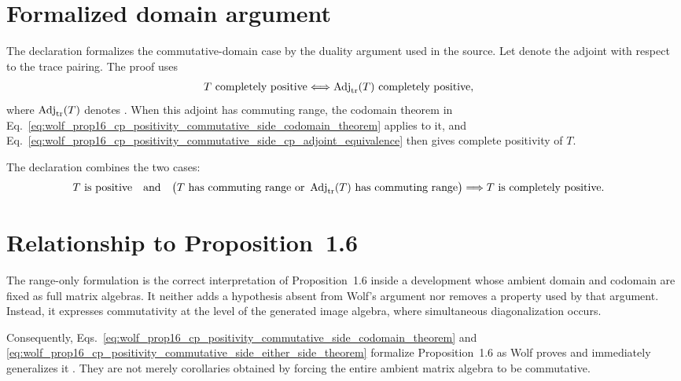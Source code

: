 \documentclass{article}
\begin{document}
\section{Formalized domain argument}

The declaration
formalizes the commutative-domain case by the duality argument used in the
source. Let  denote the adjoint with respect
to the trace pairing. The proof uses
\begin{align}
    T\text{ completely positive}
        &\Longleftrightarrow
        \operatorname{Adj}_{\operatorname{tr}}(T)\text{ completely positive},
    \label{eq:wolf_prop16_cp_positivity_commutative_side_cp_adjoint_equivalence}
\end{align}
where $\operatorname{Adj}_{\operatorname{tr}}(T)$ denotes
. When this adjoint has commuting range, the
codomain theorem in
Eq.~\ref{eq:wolf_prop16_cp_positivity_commutative_side_codomain_theorem}
applies to it, and
Eq.~\ref{eq:wolf_prop16_cp_positivity_commutative_side_cp_adjoint_equivalence}
then gives complete positivity of $T$.

The declaration
combines the two cases:
\begin{align}
    T\text{ is positive}
    \quad\text{and}\quad
    \bigl(  T\text{ has commuting range}
      \ \text{or}\
      \operatorname{Adj}_{\operatorname{tr}}(T)\text{ has commuting range}
    \bigr)
        &\Longrightarrow T\text{ is completely positive}.
    \label{eq:wolf_prop16_cp_positivity_commutative_side_either_side_theorem}
\end{align}

\section{Relationship to Proposition~1.6}

The range-only formulation is the correct interpretation of Proposition~1.6
inside a development whose ambient domain and codomain are fixed as full
matrix algebras. It neither adds a hypothesis absent from Wolf's argument nor
removes a property used by that argument. Instead, it expresses commutativity
at the level of the generated image algebra, where simultaneous
diagonalization occurs.

Consequently,
Eqs.~\ref{eq:wolf_prop16_cp_positivity_commutative_side_codomain_theorem} and
\ref{eq:wolf_prop16_cp_positivity_commutative_side_either_side_theorem}
formalize Proposition~1.6 as Wolf proves and immediately generalizes it
\cite[Proposition~1.6]{Wolf2012Quantum}. They are not merely corollaries
obtained by forcing the entire ambient matrix algebra to be commutative.
\end{document}
